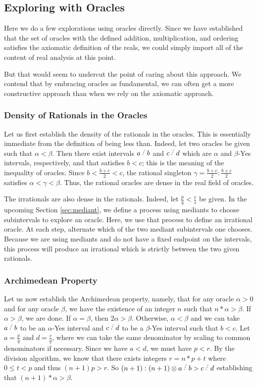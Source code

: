 \documentclass[12pt]{article}
\begin{document}
\subsection{Exploring with Oracles}

Here we do a few explorations using oracles directly. Since we have established that the set of oracles with the defined addition, multiplication, and ordering satisfies the axiomatic definition of the reals, we could simply import all of the content of real analysis at this point. 

But that would seem to undercut the point of caring about this approach. We contend that by embracing oracles as fundamental, we can often get a more constructive approach than when we rely on the axiomatic approach. 

\subsubsection{Density of Rationals in the Oracles}

Let us first establish the density of the rationals in the oracles. This is essentially immediate from the definition of being less than. Indeed, let two oracles be given such that $\alpha < \beta$. Then there exist intervals $a\lte b$ and $c\lte d$ which are $\alpha$ and $\beta$-Yes intervals, respectively, and that satisfies $b < c$; this is the meaning of the inequality of oracles. Since $b < \frac{b+c}{2} < c$, the rational singleton $\gamma = \frac{b+c}{2}:\frac{b+c}{2}$ satisfies $\alpha < \gamma < \beta$. Thus, the rational oracles are dense in the real field of oracles. 

The irrationals are also dense in the rationals. Indeed, let $\frac{p}{q} <\frac{r}{s}$ be given. In the upcoming Section \ref{sec:mediant}, we define a process using mediants to choose subintervals to explore an oracle. Here, we use that process to define an irrational oracle. At each step, alternate which of the two mediant subintervals one chooses. Because we are using mediants and do not have a fixed endpoint on the intervals, this process will produce an irrational which is strictly between the two given rationals. 

\subsubsection{Archimedean Property}

Let us now establish the Archimedean property, namely, that for any oracle $\alpha > 0$ and for any oracle $\beta$, we have the existence of an integer $n$ such that $n * \alpha > \beta $. If $\alpha > \beta$, we are done. If $\alpha = \beta$, then $2 \alpha > \beta$. Otherwise, $\alpha < \beta$ and we can take $a\lte b$ to be an $\alpha$-Yes interval and $c \lte d$ to be a $\beta$-Yes interval such that $b < c$. Let $a = \frac{p}{q}$ and $d = \frac{r}{q}$, where we can take the same denominator by scaling to common denominators if necessary. Since we have $a<d$, we must have $p < r$. By the division algorithm, we know that there exists integers $r = n*p + t$ where $0 \leq  t<p$ and thus $(n+1)p > r$. So $(n+1):(n+1) \otimes a\lte b > c\lte d$ establishing that $(n+1)*\alpha > \beta$.
\end{document}
